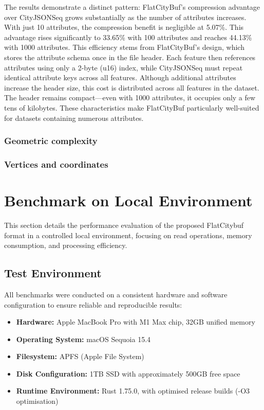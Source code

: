 The results demonstrate a distinct pattern: FlatCityBuf's compression advantage over CityJSONSeq grows substantially as the number of attributes increases. With just 10 attributes, the compression benefit is negligible at 5.07\%. This advantage rises significantly to 33.65\% with 100 attributes and reaches 44.13\% with 1000 attributes. This efficiency stems from FlatCityBuf's design, which stores the attribute schema once in the file header. Each feature then references attributes using only a 2-byte (u16) index, while CityJSONSeq must repeat identical attribute keys across all features. Although additional attributes increase the header size, this cost is distributed across all features in the dataset. The header remains compact—even with 1000 attributes, it occupies only a few tens of kilobytes. These characteristics make FlatCityBuf particularly well-suited for datasets containing numerous attributes.

\subsubsection{Geometric complexity}
\label{result:overview:analysis_of_file_size_results:geometric_complexity}

\subsubsection{Vertices and coordinates}
\label{result:overview:analysis_of_file_size_results:vertices_and_coordinates}

\section{Benchmark on Local Environment}
\label{result:benchmark_on_local_environment}

This section details the performance evaluation of the proposed FlatCitybuf format in a controlled local environment, focusing on read operations, memory consumption, and processing efficiency.

\subsection{Test Environment}
\label{result:benchmark_on_local_environment:test_environment}

All benchmarks were conducted on a consistent hardware and software configuration to ensure reliable and reproducible results:

\begin{itemize}
  \item \textbf{Hardware:} Apple MacBook Pro with M1 Max chip, 32GB unified memory
  \item \textbf{Operating System:} macOS Sequoia 15.4
  \item \textbf{Filesystem:} APFS (Apple File System)
  \item \textbf{Disk Configuration:} 1TB SSD with approximately 500GB free space
  \item \textbf{Runtime Environment:} Rust 1.75.0, with optimised release builds (-O3 optimisation)
\end{itemize}

